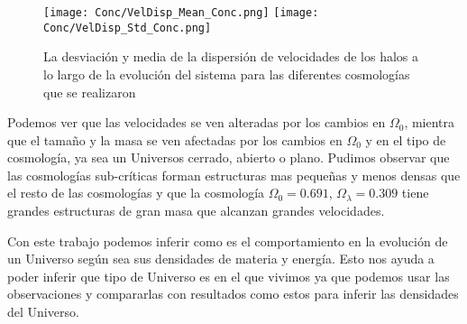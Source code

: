 \begin{figure}[H]
      \centering
      \texttt{[image: Conc/VelDisp\_Mean\_Conc.png]}
      \texttt{[image: Conc/VelDisp\_Std\_Conc.png]}
      \caption[Evolución de la desviación y media de la dispersión de velocidades los halos para todas las cosmologías]{La desviación y media de la dispersión de velocidades de los halos a lo largo de la evolución del sistema para las diferentes cosmologías que se realizaron}
      \label{fig:Conc_VelDisp}
\end{figure}

Podemos ver que las velocidades se ven alteradas por los cambios en $\Omega_0$, mientra que el tamaño y la masa se ven afectadas por los cambios en $\Omega_0$ y en el tipo de cosmología, ya sea un Universos cerrado, abierto o plano. Pudimos observar que las cosmologías sub-críticas forman estructuras mas pequeñas y menos densas que el resto de las cosmologías y que la cosmología $\Omega_0 = 0.691$, $\Omega_\lambda = 0.309$ tiene grandes estructuras de gran masa que alcanzan grandes velocidades.

Con este trabajo podemos inferir como es el comportamiento en la evolución de un Universo según sea sus densidades de materia y energía. Esto nos ayuda a poder inferir que tipo de Universo es en el que vivimos ya que podemos usar las observaciones y compararlas con resultados como estos para inferir las densidades del Universo.
 

\lhead[\fancyplain{}{}]%
      {\fancyplain{}{\bfseries\rightmark}}
